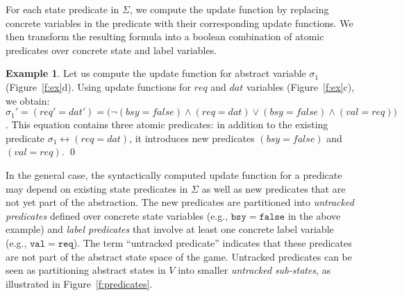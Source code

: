 \documentclass{book}
\theoremstyle{definition}
\newtheorem*{ex}{Example}
\begin{document}
For each state predicate in $\Sigma$, we compute the update function by replacing concrete variables in the predicate with their corresponding update functions. We then transform the resulting formula into a boolean combination of atomic predicates over concrete state and label variables.

\begin{ex}
    \everymath{\mathtt{\xdef\tmp{\fam\the\fam\relax}\aftergroup\tmp}}
    \everydisplay{\mathtt{\xdef\tmp{\fam\the\fam\relax}\aftergroup\tmp}}
    Let us compute the update function for abstract variable $\sigma_1$ (Figure~\ref{f:ex}d).  Using update functions for $req$ and $dat$ variables (Figure~\ref{f:ex}c), we obtain: $\sigma_1' = (req' = dat') = \big(\neg(bsy = false) \land (req=dat) \lor (bsy=false) \land (val=req)\big)$. This equation contains three atomic predicates: in addition to the existing predicate $\sigma_1 \leftrightarrow (req=dat)$, it introduces new predicates $(bsy=false)$ and $(val=req)$.  
    \qed
\end{ex}

In the general case, the syntactically computed update function 
for a predicate may depend on existing state predicates in 
$\Sigma$ as well as new predicates that are not yet part of the 
abstraction.  The new predicates are partitioned into 
\emph{untracked predicates} defined over concrete state variables 
(e.g., $\mathtt{bsy=false}$ in the above example) and \emph{label 
predicates} that involve at least one concrete label variable 
(e.g., $\mathtt{val=req}$).  The term ``untracked predicate'' 
indicates that these predicates are not part of the 
abstract state space of the game.  Untracked predicates can be 
seen as partitioning abstract states in $V$ into smaller 
\emph{untracked sub-states}, as illustrated in 
Figure~\ref{f:predicates}.
\end{document}
